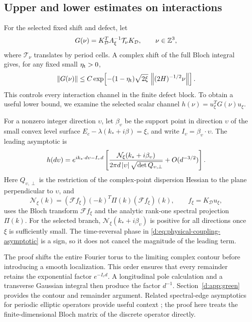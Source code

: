 \subsection{Upper and lower estimates on interactions}

For the selected fixed shift and defect, let
\begin{equation}
 G(\nu)=K_{\mathcal D}^TA_\xi^{-1}\mathcal T_\nu K_{\mathcal D},
 \qquad \nu\in\mathbb Z^3,
 \label{d:eq:physical-interaction-block}
\end{equation}
where \(\mathcal T_\nu\) translates by period cells. A complex shift of the full
Bloch integral gives, for any fixed small \(\eta_{\rm t}>0\),
\begin{equation}
 \left\lVert G(\nu)\right\rVert
 \le C\exp\!\left[
   -(1-\eta_{\rm t})\sqrt{2\xi}\,
   \left\lVert (2H)^{-1/2}\nu\right\rVert\right].
 \label{d:eq:physical-block-upper}
\end{equation}
This controls every interaction channel in the finite defect block.
To obtain a useful lower bound, we examine the selected scalar channel
\(h(\nu)=u_\xi^TG(\nu)u_\xi\).

For a nonzero integer direction \(\upsilon\), let \(\beta_\upsilon\) be the support
point in direction \(\upsilon\) of the small convex level surface
\(E_c-\lambda(k_*+i\beta)=\xi\), and write
\(I_\upsilon=\beta_\upsilon\cdot\upsilon\). The leading asymptotic is
\begin{equation}
 h(d\upsilon)=e^{ik_*\cdot d\upsilon-I_\upsilon d}
 \left[
 \frac{\mathcal N_\xi(k_*+i\beta_\upsilon)}
 {2\pi d\left\lvert \upsilon\right\rvert\sqrt{\det Q_{\upsilon,\perp}}}
 +O(d^{-3/2})
 \right].
 \label{d:eq:physical-coupling-asymptotic}
\end{equation}
Here \(Q_{\upsilon,\perp}\) is the restriction of the complex-point dispersion
Hessian to the plane perpendicular to \(\upsilon\), and
\[
 \mathcal N_\xi(k)=
 (\mathcal Ff_\xi)(-k)^T\Pi(k)(\mathcal Ff_\xi)(k),
 \qquad f_\xi=K_{\mathcal D}u_\xi,
\]
uses the Bloch transform \(\mathcal Ff_\xi\) and the analytic rank-one spectral projection \(\Pi(k)\).
For the selected branch, \(\mathcal N_\xi(k_*+i\beta_\upsilon)\) is positive for all
directions once \(\xi\) is sufficiently small. The time-reversal phase in
\eqref{d:eq:physical-coupling-asymptotic} is a sign, so it does not cancel
the magnitude of the leading term.

The proof shifts the entire Fourier torus to the limiting complex
contour before introducing a smooth localization. This order ensures
that every remainder retains the exponential factor
\(e^{-I_\upsilon d}\). A longitudinal pole calculation and a transverse Gaussian
integral then produce the factor \(d^{-1}\). Section~\ref{d:app:green}
provides the contour and remainder argument. Related spectral-edge
asymptotics for periodic elliptic operators provide useful context
\cite{kha2017}; the proof here treats the finite-dimensional Bloch
matrix of the discrete operator directly.

